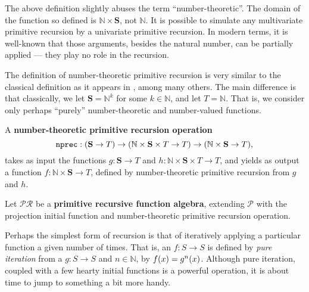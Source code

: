 \begin{remark} The above definition slightly abuses the term
``number-theoretic''. The domain of the function so defined is $\mathbb{N}
\times \mathbf{S}$, not $\mathbb{N}$. It is possible to simulate any
multivariate primitive recursion by a univariate primitive
recursion\cite{rose-1984}.  In modern terms, it is well-known that those
arguments, besides the natural number, can be partially applied --- they play
no role in the recursion.  \end{remark}

\begin{remark} The definition of number-theoretic primitive recursion is very
similar to the classical definition as it appears in \cite{dedekind-1888,
goedel-1944, rose-1984, odifreddi-1989}, among many others. The main difference
is that classically, we let $\mathbf{S}=\mathbb{N}^k$ for some $k \in
\mathbb{N}$, and let $T = \mathbb{N}$. That is, we consider only perhaps
``purely'' number-theoretic and number-valued functions. \end{remark}

\begin{definition} A \textbf{number-theoretic primitive recursion operation}
%
$$\mathtt{nprec} : {\mathopen{}\left({\mathbf{S} \rightarrow T}\right)\mathclose{}} \rightarrow {\ensuremath{\mathopen{}\left({\mathbb{N}
\times \mathbf{S} \times T \rightarrow T}\right)\mathclose{}}} \rightarrow {\ensuremath{\mathopen{}\left({\mathbb{N} \times
\mathbf{S} \rightarrow T}\right)\mathclose{}}},$$
%
takes as input the functions $g : \mathbf{S} \rightarrow T$ and $h : \mathbb{N}
\times \mathbf{S} \times T \rightarrow T$, and yields as output a function $f :
\mathbb{N} \times \mathbf{S} \rightarrow T$, defined by number-theoretic
primitive recursion from $g$ and $h$.\end{definition}

\begin{definition} Let $\mathcal{PR}$ be a \textbf{primitive recursive function
algebra}, extending $\mathcal{P}$ with the projection initial function and
number-theoretic primitive recursion operation.\end{definition}


Perhaps the simplest form of recursion is that of iteratively applying a
particular function a given number of times.  That is, an $f : S \rightarrow S$
is defined by \emph{pure iteration} from a $g : S \rightarrow S$ and $n \in
\mathbb{N}$, by $f{\mathopen{}\left({x}\right)\mathclose{}} = g^n{\mathopen{}\left({x}\right)\mathclose{}}$. Although pure iteration, coupled with a
few hearty initial functions is a powerful operation\cite{rose-1984}, it is
about time to jump to something a bit more handy.

